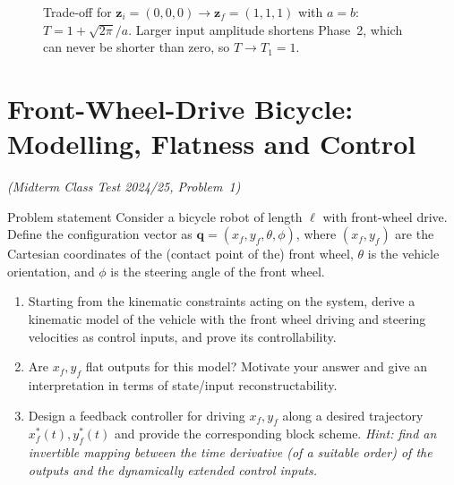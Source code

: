 \documentclass[11pt,a4paper]{article}
\theoremstyle{definition}
\theoremstyle{plain}
\theoremstyle{remark}
\newcommand{\q}{\boldsymbol{q}}
\newcommand{\z}{\boldsymbol{z}}
\begin{document}
\begin{figure}[H]
\centering
{}
\caption{Trade-off for $\z_i=(0,0,0)\to\z_f=(1,1,1)$ with $a=b$: $T=1+\sqrt{2\pi}/a$. Larger input amplitude shortens Phase~2, which can never be shorter than zero, so $T\to T_1=1$.}
\end{figure}

\section{Front-Wheel-Drive Bicycle: Modelling, Flatness and Control}
\label{sec:bicycle}
\emph{(Midterm Class Test 2024/25, Problem~1)}

\begin{problem}{Problem statement}
Consider a bicycle robot of length $\ell$ with front-wheel drive. Define the configuration vector as $\q=(x_f,y_f,\theta,\phi)$, where $(x_f,y_f)$ are the Cartesian coordinates of the (contact point of the) front wheel, $\theta$ is the vehicle orientation, and $\phi$ is the steering angle of the front wheel.
\begin{enumerate}[label=(\alph*),nosep]
  \item Starting from the kinematic constraints acting on the system, derive a kinematic model of the vehicle with the front wheel driving and steering velocities as control inputs, and prove its controllability.
  \item Are $x_f,y_f$ flat outputs for this model? Motivate your answer and give an interpretation in terms of state/input reconstructability.
  \item Design a feedback controller for driving $x_f,y_f$ along a desired trajectory $x_f^*(t),y_f^*(t)$ and provide the corresponding block scheme. \emph{Hint: find an invertible mapping between the time derivative (of a suitable order) of the outputs and the dynamically extended control inputs.}
\end{enumerate}
\end{problem}
\end{document}
